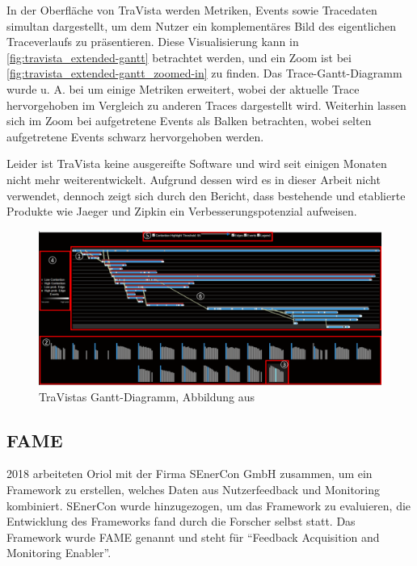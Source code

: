 In der Oberfläche von TraVista werden Metriken, Events sowie Tracedaten simultan dargestellt, um dem Nutzer ein komplementäres Bild des eigentlichen Traceverlaufs zu präsentieren. Diese Visualisierung kann in \autoref{fig:travista_extended-gantt} betrachtet werden, und ein Zoom ist bei \autoref{fig:travista_extended-gantt_zoomed-in} zu finden. Das Trace-Gantt-Diagramm wurde u. A. bei  um einige Metriken erweitert, wobei der aktuelle Trace hervorgehoben im Vergleich zu anderen Traces dargestellt wird. Weiterhin lassen sich im Zoom bei  aufgetretene Events als Balken betrachten, wobei selten aufgetretene Events schwarz hervorgehoben werden.

Leider ist TraVista keine ausgereifte Software und wird seit einigen Monaten nicht mehr weiterentwickelt\footnotemark{}. Aufgrund dessen wird es in dieser Arbeit nicht verwendet, dennoch zeigt sich durch den Bericht, dass bestehende und etablierte Produkte wie Jaeger und Zipkin ein Verbesserungspotenzial aufweisen.


\begin{figure}[H]
	\centering
	\includegraphics[width=0.815\linewidth]{img/03_methoden/travista_extended-gantt.png}
	\caption{TraVistas Gantt-Diagramm, Abbildung aus \cite{TraVistaPaper}}
	\label{fig:travista_extended-gantt}
\end{figure}

\subsection{FAME}
\label{sec:fame}

2018 arbeiteten Oriol \etal \cite{FamePaper} mit der Firma SEnerCon GmbH zusammen, um ein Framework zu erstellen, welches Daten aus Nutzerfeedback und Monitoring kombiniert. SEnerCon wurde hinzugezogen, um das Framework zu evaluieren, die Entwicklung des Frameworks fand durch die Forscher selbst statt. Das Framework wurde FAME\footnotemark{} genannt und steht für \enquote{Feedback Acquisition and Monitoring Enabler}.


